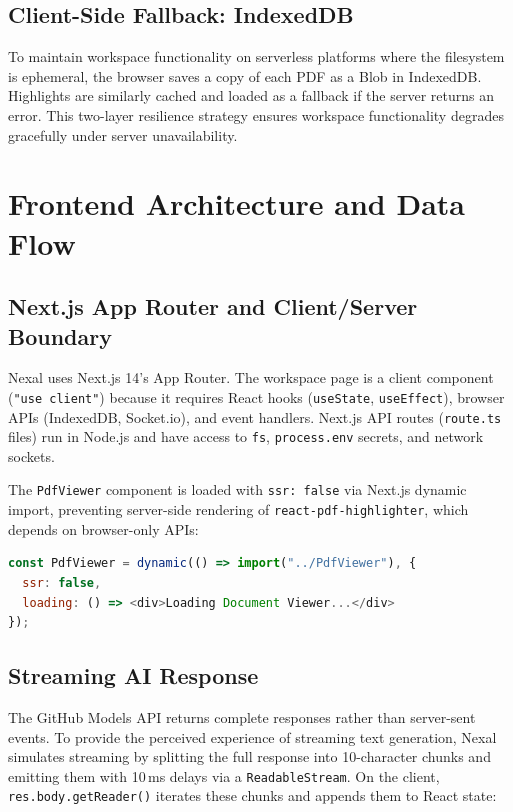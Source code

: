 \documentclass[conference]{IEEEtran}
\begin{document}
\subsection{Client-Side Fallback: IndexedDB}

To maintain workspace functionality on serverless platforms where the filesystem is ephemeral, the browser saves a copy of each PDF as a Blob in IndexedDB. Highlights are similarly cached and loaded as a fallback if the server returns an error. This two-layer resilience strategy ensures workspace functionality degrades gracefully under server unavailability.

\section{Frontend Architecture and Data Flow}
\label{sec:frontend}

\subsection{Next.js App Router and Client/Server Boundary}

Nexal uses Next.js 14's App Router. The workspace page is a client component (\texttt{"use client"}) because it requires React hooks (\texttt{useState}, \texttt{useEffect}), browser APIs (IndexedDB, Socket.io), and event handlers. Next.js API routes (\texttt{route.ts} files) run in Node.js and have access to \texttt{fs}, \texttt{process.env} secrets, and network sockets.

The \texttt{PdfViewer} component is loaded with \texttt{ssr: false} via Next.js dynamic import, preventing server-side rendering of \texttt{react-pdf-highlighter}, which depends on browser-only APIs:

\begin{lstlisting}[language=JavaScript]
const PdfViewer = dynamic(() => import("../PdfViewer"), {
  ssr: false,
  loading: () => <div>Loading Document Viewer...</div>
});
\end{lstlisting}

\subsection{Streaming AI Response}

The GitHub Models API returns complete responses rather than server-sent events. To provide the perceived experience of streaming text generation, Nexal simulates streaming by splitting the full response into 10-character chunks and emitting them with 10\,ms delays via a \texttt{ReadableStream}. On the client, \texttt{res.body.getReader()} iterates these chunks and appends them to React state:
\end{document}
